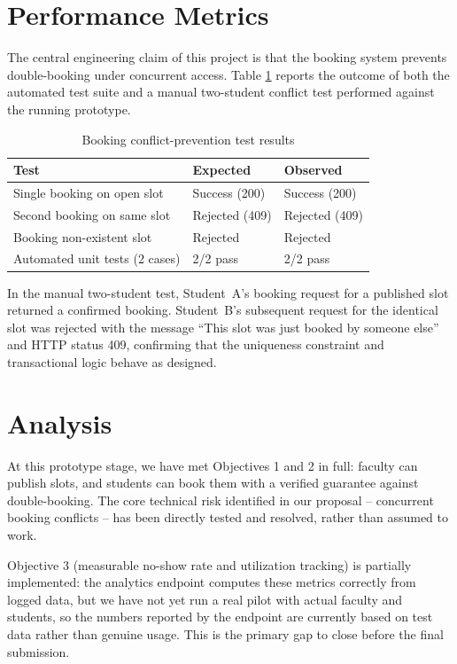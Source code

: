 \documentclass{tietreport}
\begin{document}
\section{Performance Metrics}

The central engineering claim of this project is that the
booking system prevents double-booking under concurrent
access. Table \ref{tab:results} reports the outcome of
both the automated test suite and a manual two-student
conflict test performed against the running prototype.

\begin{table}[h]
\centering
\begin{tabular}{|l|l|l|}
  \hline
  \textbf{Test} & \textbf{Expected} & \textbf{Observed} \\
  \hline
  Single booking on open slot & Success (200) & Success (200) \\
  \hline
  Second booking on same slot & Rejected (409) & Rejected (409) \\
  \hline
  Booking non-existent slot & Rejected & Rejected \\
  \hline
  Automated unit tests (2 cases) & 2/2 pass & 2/2 pass \\
  \hline
\end{tabular}
\caption{Booking conflict-prevention test results}
\label{tab:results}
\end{table}

In the manual two-student test, Student~A's booking
request for a published slot returned a confirmed booking.
Student~B's subsequent request for the identical slot was
rejected with the message ``This slot was just booked by
someone else'' and HTTP status 409, confirming that the
uniqueness constraint and transactional logic behave as
designed.

\section{Analysis}

At this prototype stage, we have met Objectives 1 and 2 in
full: faculty can publish slots, and students can book
them with a verified guarantee against double-booking. The
core technical risk identified in our proposal --
concurrent booking conflicts -- has been directly tested
and resolved, rather than assumed to work.

Objective 3 (measurable no-show rate and utilization
tracking) is partially implemented: the analytics endpoint
computes these metrics correctly from logged data, but we
have not yet run a real pilot with actual faculty and
students, so the numbers reported by the endpoint are
currently based on test data rather than genuine usage.
This is the primary gap to close before the final
submission.
\end{document}
